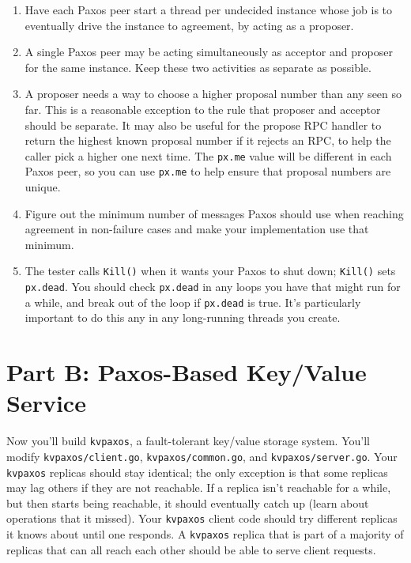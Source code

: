 \documentclass{article}
\newcommand{\code}{\texttt}
\begin{document}
\begin{enumerate}
    \item Have each Paxos peer start a thread per undecided instance
whose job is to eventually drive the instance to agreement, by acting as
a proposer.

    \item A single Paxos peer may be acting simultaneously as acceptor and
proposer for the same instance. Keep these two activities as separate
as possible.

    \item A proposer needs a way to choose a higher proposal number than
any seen so far. This is a reasonable exception to the rule that proposer
and acceptor should be separate. It may also be useful for the propose
RPC handler to return the highest known proposal number if it rejects
an RPC, to help the caller pick a higher one next time. The \code{px.me} value
will be different in each Paxos peer, so you can use \code{px.me} to help
ensure that proposal numbers are unique.

    \item Figure out the minimum number of messages Paxos should use
when reaching agreement in non-failure cases and make your
implementation use that minimum.
    
    \item The tester calls \code{Kill()} when it wants your Paxos to shut down; \code{Kill()}
sets \code{px.dead}. You should check \code{px.dead} in any loops you have that
might run for a while, and break out of the loop if \code{px.dead} is true. It's
particularly important to do this any in any long-running threads you
create.
\end{enumerate}

\section{Part B: Paxos-Based Key/Value Service}
Now you'll build \code{kvpaxos}, a fault-tolerant key/value storage system.
You'll modify \code{kvpaxos/client.go}, \code{kvpaxos/common.go}, and
\code{kvpaxos/server.go}.
Your \code{kvpaxos} replicas should stay identical; the only exception is that
some replicas may lag others if they are not reachable. If a replica isn't
reachable for a while, but then starts being reachable, it should
eventually catch up (learn about operations that it missed).
Your \code{kvpaxos} client code should try different replicas it knows about
until one responds. A \code{kvpaxos} replica that is part of a majority of
replicas that can all reach each other should be able to serve client
requests.
\end{document}
